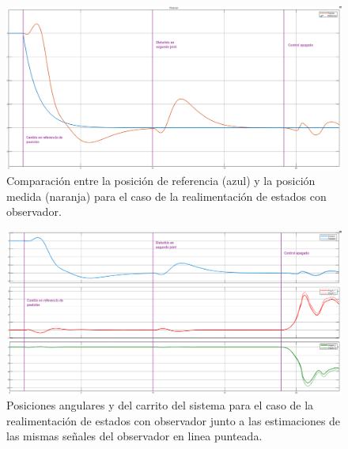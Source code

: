 
\begin{figure}[H]
	\centering
	\includegraphics[width=\linewidth]{../Analisis de Resultados/ImagenesAnalisis de Resultados/obsv_posref.png}
	\caption{Comparación entre la posición de referencia (azul) y la posición medida (naranja) para el caso de la realimentación de estados con observador.}	
	\label{fig:obsv_posref}
\end{figure}

\begin{figure}[H]
	\centering
	\includegraphics[width=\linewidth]{../Analisis de Resultados/ImagenesAnalisis de Resultados/obsv_vars.png}
	\caption{Posiciones angulares y del carrito del sistema para el caso de la realimentación de estados con observador junto a las estimaciones de las mismas señales del observador en linea punteada.}	
	\label{fig:obsv_vars}
\end{figure}


